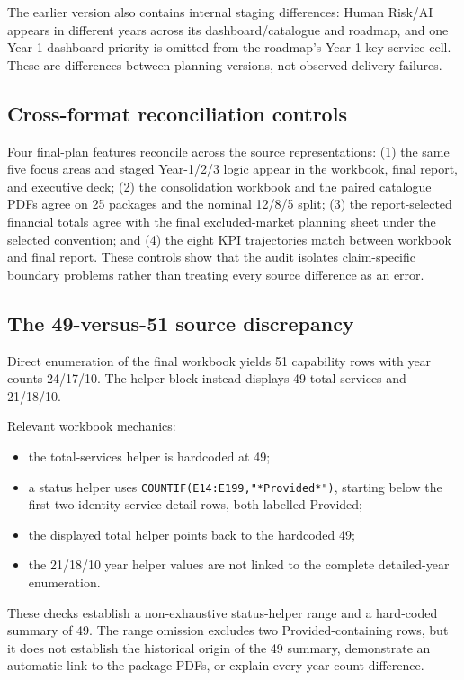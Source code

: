The earlier version also contains internal staging differences: Human Risk/AI appears in different years across its dashboard/catalogue and roadmap, and one Year-1 dashboard priority is omitted from the roadmap's Year-1 key-service cell. These are differences between planning versions, not observed delivery failures.


\subsection{Cross-format reconciliation controls}\label{app:cross-format}
Four final-plan features reconcile across the source representations: (1) the same five focus areas and staged Year-1/2/3 logic appear in the workbook, final report, and executive deck; (2) the consolidation workbook and the paired catalogue PDFs agree on 25 packages and the nominal 12/8/5 split; (3) the report-selected financial totals agree with the final excluded-market planning sheet under the selected convention; and (4) the eight KPI trajectories match between workbook and final report. These controls show that the audit isolates claim-specific boundary problems rather than treating every source difference as an error.


\subsection{The 49-versus-51 source discrepancy}\label{app:count-conflict}
Direct enumeration of the final workbook yields 51 capability rows with year counts 24/17/10. The helper block instead displays 49 total services and 21/18/10.

Relevant workbook mechanics:
\begin{itemize}[leftmargin=1.4em]
\item the total-services helper is hardcoded at 49;
\item a status helper uses \texttt{COUNTIF(E14:E199,"*Provided*")}, starting below the first two identity-service detail rows, both labelled Provided;
\item the displayed total helper points back to the hardcoded 49;
\item the 21/18/10 year helper values are not linked to the complete detailed-year enumeration.
\end{itemize}
These checks establish a non-exhaustive status-helper range and a hard-coded summary of 49. The range omission excludes two Provided-containing rows, but it does not establish the historical origin of the 49 summary, demonstrate an automatic link to the package PDFs, or explain every year-count difference.



